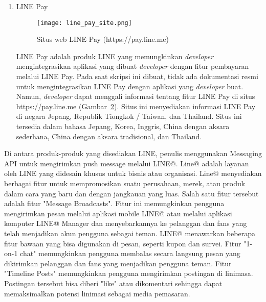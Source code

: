 \begin{enumerate}
\begin{figure}[H]
	\centering  
	\texttt{[image: clova\_site.png]}  
	\caption[Situs web Clova]{Situs web Clova (https://clova-developers.line.me)} 
	\label{fig:clova_site} 
\end{figure}

Clova adalah sebuah AI Assistant (aplikasi dengan kecerdasan buatan yang berfungsi sebagai asisten) yang dipasang di dalam Clova Wave dan Clova Friends. Clova masih dalam tahap \textit{developer}an dan (pada saat skripsi ini dibuat) tersedia dalam versi beta. Tidak ada dokumentasi resmi untuk produk ini, namun disediakan situs web untuk menggali informasi tentang Clova : https://clova-developers.line.me (Gambar~\ref{fig:clova_site}). Pada saat skripsi ini ditulis, situs web ini hanya tersedia dalam bahasa Jepang sehingga membutuhkan penerjemah apabila tidak menguasai bahasa Jepang.

\item LINE Pay
\begin{figure}[H]
	\centering  
	\texttt{[image: line\_pay\_site.png]}  
	\caption[Situs web LINE Pay]{Situs web LINE Pay (https://pay.line.me)} 
	\label{fig:line_pay_site} 
\end{figure}

LINE Pay adalah produk LINE yang memungkinkan \textit{developer} mengintegrasikan aplikasi yang dibuat \textit{developer} dengan fitur pembayaran melalui LINE Pay. Pada saat skripsi ini dibuat, tidak ada dokumentasi resmi untuk mengintegrasikan LINE Pay dengan aplikasi yang \textit{developer} buat. Namun, \textit{developer} dapat menggali informasi tentang fitur LINE Pay di situs https://pay.line.me (Gambar~\ref{fig:line_pay_site}). Situs ini menyediakan informasi LINE Pay di negara Jepang, Republik Tiongkok / Taiwan, dan Thailand. Situs ini tersedia dalam bahasa Jepang, Korea, Inggris, China dengan aksara sederhana, China dengan aksara tradisional, dan Thailand.

\end{enumerate}

Di antara produk-produk yang disediakan LINE, penulis menggunakan Messaging API untuk mengirimkan push message melalui LINE@. Line@ adalah layanan oleh LINE yang didesain khusus untuk bisnis atau organisasi. Line@ menyediakan berbagai fitur untuk mempromosikan suatu perusahaan, merek, atau produk dalam cara yang baru dan dengan jangkauan yang luas. Salah satu fitur tersebut adalah fitur "Message Broadcasts". Fitur ini memungkinkan pengguna mengirimkan pesan melalui aplikasi mobile LINE@ atau melalui aplikasi komputer LINE@ Manager dan menyebarkannya ke pelanggan dan fans yang telah menjadikan akun pengguna sebagai teman. LINE@ menawarkan beberapa fitur bawaan yang bisa digunakan di pesan, seperti kupon dan survei. Fitur "1-on-1 chat" memungkinkan pengguna membalas secara langsung pesan yang dikirimkan pelanggan dan fans yang menjadikan pengguna teman. Fitur "Timeline Posts" memungkinkan pengguna mengirimkan postingan di linimasa. Postingan tersebut bisa diberi "like" atau dikomentari sehingga dapat memaksimalkan potensi linimasi sebagai media pemasaran.

